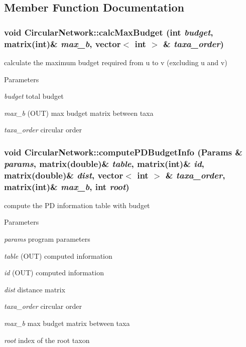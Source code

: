 \subsection{Member Function Documentation}
\hypertarget{classCircularNetwork_a71bc1e5b303f8e0b51746e55cd3315e0}{
\subsubsection[{calcMaxBudget}]{\setlength{\rightskip}{0pt plus 5cm}void CircularNetwork::calcMaxBudget (int {\em budget}, \/  matrix(int)\& {\em max\_\-b}, \/  vector$<$ int $>$ \& {\em taxa\_\-order})}}
\label{classCircularNetwork_a71bc1e5b303f8e0b51746e55cd3315e0}
calculate the maximum budget required from u to v (excluding u and v) 
\begin{DoxyParams}{Parameters}
\item[{\em budget}]total budget \item[{\em max\_\-b}](OUT) max budget matrix between taxa \item[{\em taxa\_\-order}]circular order \end{DoxyParams}
\hypertarget{classCircularNetwork_a07284c802eadf2367a90ed76eacad4ac}{
\subsubsection[{computePDBudgetInfo}]{\setlength{\rightskip}{0pt plus 5cm}void CircularNetwork::computePDBudgetInfo ({\bf Params} \& {\em params}, \/  matrix(double)\& {\em table}, \/  matrix(int)\& {\em id}, \/  matrix(double)\& {\em dist}, \/  vector$<$ int $>$ \& {\em taxa\_\-order}, \/  matrix(int)\& {\em max\_\-b}, \/  int {\em root})}}
\label{classCircularNetwork_a07284c802eadf2367a90ed76eacad4ac}
compute the PD information table with budget 
\begin{DoxyParams}{Parameters}
\item[{\em params}]program parameters \item[{\em table}](OUT) computed information \item[{\em id}](OUT) computed information \item[{\em dist}]distance matrix \item[{\em taxa\_\-order}]circular order \item[{\em max\_\-b}]max budget matrix between taxa \item[{\em root}]index of the root taxon \end{DoxyParams}
